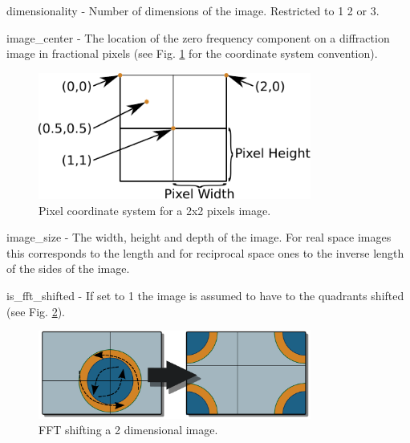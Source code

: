 \documentclass[usletter,11pt]{article}
\newcommand{\member}[2]
{ \noindent
{ \color{softBlue}  #1 - } #2
\vspace{0.2cm}
}
\begin{document}
\member{dimensionality}{Number of dimensions of the image. Restricted to 1 2 or 3.}

\member{image\_center}{The location of the zero frequency component on
 a diffraction image in fractional pixels  (see
 Fig. \ref{fig:pixel_coordinates} for the coordinate system convention).

\begin{figure}[h!]
\centering
\includegraphics[width=0.8\textwidth]{pixel_coordinates.pdf}
\caption{Pixel coordinate system for a 2x2 pixels image.}
\label{fig:pixel_coordinates}
\end{figure}
}


\member{image\_size}{The width, height and depth of the image. For
  real space images this corresponds to the length and for reciprocal
  space ones to the inverse length of the sides of the image.}

\member{is\_fft\_shifted}{If set to 1 the image is assumed to have to
  the quadrants shifted (see Fig. \ref{fig:fft_shift}).

\begin{figure}[h!]
\centering
\includegraphics[width=0.8\textwidth]{fft_shift.pdf}
\caption{FFT shifting a 2 dimensional image.}
\label{fig:fft_shift}
\end{figure}
}
\end{document}

